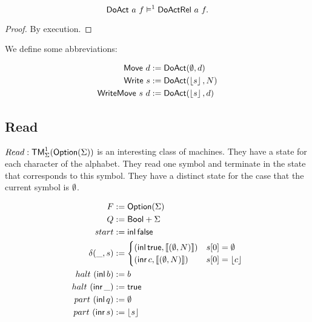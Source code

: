 \begin{lemma}
  \label{lem:tam}
  ~
  \[
    \textsf{DoAct}~a~f \vDash^1 \textsf{DoActRel}~a~f.
  \]

\end{lemma}
\begin{proof}
  By execution.
\end{proof}


We define some abbreviations:

\begin{definition}
 \label{def:DoAct-derived} 

 \begin{align*}
   \textsf{Move}       ~d &:= \textsf{DoAct} (\emptyset, d) \\
   \textsf{Write}    ~s   &:= \textsf{DoAct} (\left\lfloor {s}\right\rfloor, N) \\
   \textsf{WriteMove}~s~d &:= \textsf{DoAct} (\left\lfloor {s}\right\rfloor, d)
 \end{align*}
 
\end{definition}



\subsection{Read}
\label{sec:basic_machines-Read}

$Read : \textsf{TM}_\Sigma^1(\textsf{Option}(\Sigma))$ is an interesting class of machines.  They have a state for each character of the alphabet.  They read one
symbol and terminate in the state that corresponds to this symbol.  They have a distinct state for the case that the current symbol is $\emptyset$.


\begin{definition}[$\MS{Read}$]
  \begin{align*}
    F          &:= \textsf{Option}(\Sigma) \\
    Q          &:= \textsf{Bool}+\Sigma \\
    start      &:= \operatorname{\textsf{inl}} \textsf{false} \\
    \delta (\_, s) &:=
                     \begin{cases}
                       (\operatorname{\textsf{inl}} \textsf{true}, \left\llbracket (\emptyset, N) \right\rrbracket) & s[0] = \emptyset \\
                       (\operatorname{\textsf{inr}} c, \left\llbracket (\emptyset, N) \right\rrbracket)     & s[0] = \left\lfloor {c}\right\rfloor
                     \end{cases} \\
    halt   ~ (\operatorname{\textsf{inl}}  b) &:= b \\
    halt   ~ (\operatorname{\textsf{inr}} \_) &:= \textsf{true} \\
    part   ~ (\operatorname{\textsf{inl}}  q) &:= \emptyset \\
    part   ~ (\operatorname{\textsf{inr}}  s) &:= \left\lfloor {s}\right\rfloor
  \end{align*}
\end{definition}


